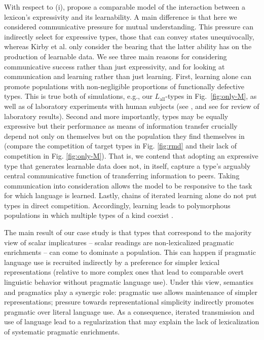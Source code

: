 \documentclass[a4paper, 11pt]{article}
\theoremstyle{Satz}
\newcommand{\mylang}[1]{\ensuremath{L_{\text{#1}}}\xspace} %
\newcommand{\Lall}{\mylang{all}}
\begin{document}
With respect to (i), \citet{kirby+etal:2015} propose a comparable model of the interaction
between a lexicon's expressivity and its learnability. A main difference is that here we
considered communicative pressure for mutual understanding. This pressure can indirectly select for expressive types, those that can convey states unequivocally, whereas Kirby et al. only consider the bearing that the latter ability has on the production of learnable data. We see three main reasons for considering communicative success rather than just
expressivity, and for looking at communication and learning rather than just learning. First, learning alone can  promote populations with non-negligible proportions of functionally defective types. This is true both of simulations, e.g., our $\Lall$-types in Fig.~\ref{fig:only-M}, as well as of laboratory experiments with human subjects (see \citealt{kirby+etal:2008,silvey+etal:2014}, and see \citealt{fay+etal:2013} for review of laboratory results). Second and more importantly, types may be equally expressive but their performance as means of information transfer crucially depend not only on themselves but on the population they find themselves in (compare the competition of target types in Fig. 
\ref{fig:rmd} and their lack of competition in Fig. \ref{fig:only-M}). That is, we contend that adopting an expressive type that generates learnable data does not, in itself, capture a type's arguably central communicative function of transferring information to peers. Taking communication into consideration allows the model to be responsive to the task for which language is learned. Lastly, chains of iterated learning alone do not put types in direct competition. Accordingly, learning leads to polymorphous populations in which multiple types of a kind coexist \citep{nowak:2006}. 

The main result of our case study is that types that correspond to the majority view of scalar
implicatures -- scalar readings are non-lexicalized pragmatic enrichments -- can come to dominate a
population. This can happen if pragmatic language use is recruited indirectly by a preference for simpler lexical representations (relative to more complex ones that lead to comparable overt linguistic behavior without pragmatic language use). Under this view, semantics
and pragmatics play a synergic role: pragmatic use allows maintenance of simpler representations;
pressure towards representational simplicity indirectly promotes pragmatic over literal
language use. As a consequence, iterated transmission and use of language lead to a
regularization that may explain the lack of lexicalization of systematic pragmatic enrichments.
\end{document}

